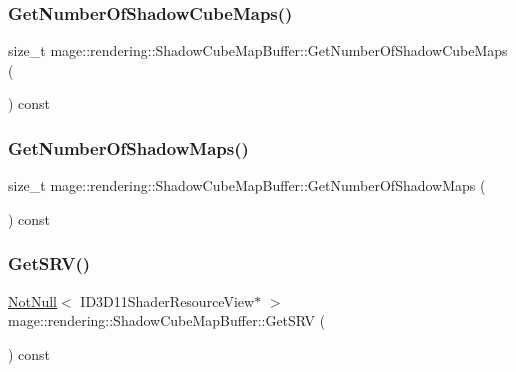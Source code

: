 \subsubsection{\texorpdfstring{Get\+Number\+Of\+Shadow\+Cube\+Maps()}{GetNumberOfShadowCubeMaps()}}
{\footnotesize\ttfamily size\+\_\+t mage\+::rendering\+::\+Shadow\+Cube\+Map\+Buffer\+::\+Get\+Number\+Of\+Shadow\+Cube\+Maps (\begin{DoxyParamCaption}{ }\end{DoxyParamCaption}) const\hspace{0.3cm}{\ttfamily [noexcept]}}

\hypertarget{classmage_1_1rendering_1_1_shadow_cube_map_buffer_a491b9a0306748de68b2cb391e572cb7d}{}\label{classmage_1_1rendering_1_1_shadow_cube_map_buffer_a491b9a0306748de68b2cb391e572cb7d} 
\subsubsection{\texorpdfstring{Get\+Number\+Of\+Shadow\+Maps()}{GetNumberOfShadowMaps()}}
{\footnotesize\ttfamily size\+\_\+t mage\+::rendering\+::\+Shadow\+Cube\+Map\+Buffer\+::\+Get\+Number\+Of\+Shadow\+Maps (\begin{DoxyParamCaption}{ }\end{DoxyParamCaption}) const\hspace{0.3cm}{\ttfamily [noexcept]}}

\hypertarget{classmage_1_1rendering_1_1_shadow_cube_map_buffer_a2586fb38441a14c38045bc3b6a940161}{}\label{classmage_1_1rendering_1_1_shadow_cube_map_buffer_a2586fb38441a14c38045bc3b6a940161} 
\subsubsection{\texorpdfstring{Get\+S\+R\+V()}{GetSRV()}}
{\footnotesize\ttfamily \hyperlink{namespacemage_a8769f9d670d6b585ea306cb1062af94b}{Not\+Null}$<$ I\+D3\+D11\+Shader\+Resource\+View$\ast$ $>$ mage\+::rendering\+::\+Shadow\+Cube\+Map\+Buffer\+::\+Get\+S\+RV (\begin{DoxyParamCaption}{ }\end{DoxyParamCaption}) const\hspace{0.3cm}{\ttfamily [noexcept]}}

